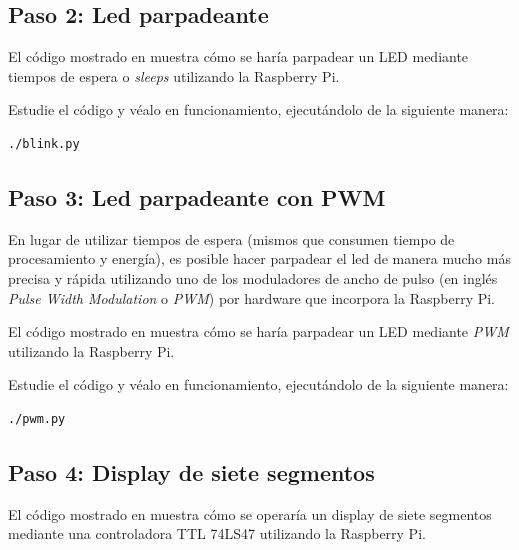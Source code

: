 \documentclass[letterpaper,10.5pt]{article}
\begin{document}
%
%
\subsection{Paso 2: Led parpadeante}%
\label{sec:step2}
El código mostrado en  muestra cómo se haría parpadear un LED mediante tiempos de espera o \emph{sleeps} utilizando la Raspberry Pi.

\smallskip

\smallskip

Estudie el código y véalo en funcionamiento, ejecutándolo de la siguiente manera:
\begin{Verbatim}[fontsize=\footnotesize]
./blink.py
\end{Verbatim}

%
%
\subsection{Paso 3: Led parpadeante con PWM}%
\label{sec:step3}
En lugar de utilizar tiempos de espera (mismos que consumen tiempo de procesamiento y energía), es posible hacer parpadear el led de manera mucho más precisa y rápida utilizando uno de los moduladores de ancho de pulso (en inglés \emph{Pulse Width Modulation} o \emph{PWM}) por hardware que incorpora la Raspberry Pi.

El código mostrado en  muestra cómo se haría parpadear un LED mediante \emph{PWM} utilizando la Raspberry Pi.

\smallskip

\smallskip

Estudie el código y véalo en funcionamiento, ejecutándolo de la siguiente manera:
\begin{Verbatim}[fontsize=\footnotesize]
./pwm.py
\end{Verbatim}


%
%
\subsection{Paso 4: Display de siete segmentos}%
\label{sec:step4}
El código mostrado en  muestra cómo se operaría un display de siete segmentos mediante una controladora TTL 74LS47 utilizando la Raspberry Pi.
\end{document}
